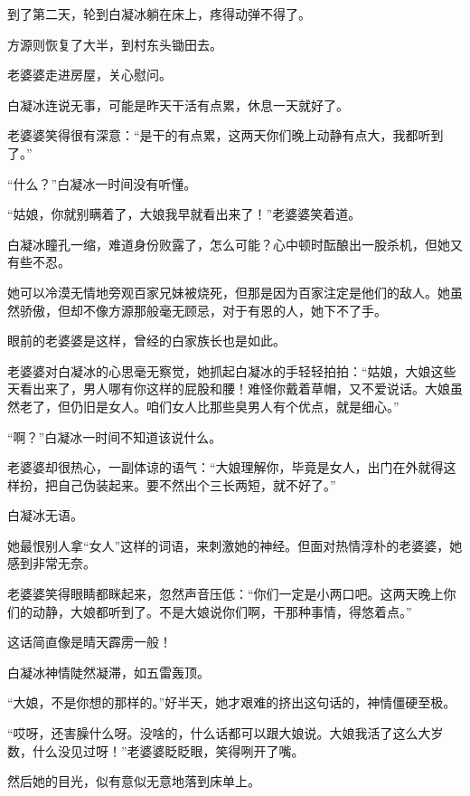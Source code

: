 
\begin{this_body}



到了第二天，轮到白凝冰躺在床上，疼得动弹不得了。

方源则恢复了大半，到村东头锄田去。

老婆婆走进房屋，关心慰问。

白凝冰连说无事，可能是昨天干活有点累，休息一天就好了。

老婆婆笑得很有深意：“是干的有点累，这两天你们晚上动静有点大，我都听到了。”

“什么？”白凝冰一时间没有听懂。

“姑娘，你就别瞒着了，大娘我早就看出来了！”老婆婆笑着道。

白凝冰瞳孔一缩，难道身份败露了，怎么可能？心中顿时酝酿出一股杀机，但她又有些不忍。

她可以冷漠无情地旁观百家兄妹被烧死，但那是因为百家注定是他们的敌人。她虽然骄傲，但却不像方源那般毫无顾忌，对于有恩的人，她下不了手。

眼前的老婆婆是这样，曾经的白家族长也是如此。

老婆婆对白凝冰的心思毫无察觉，她抓起白凝冰的手轻轻拍拍：“姑娘，大娘这些天看出来了，男人哪有你这样的屁股和腰！难怪你戴着草帽，又不爱说话。大娘虽然老了，但仍旧是女人。咱们女人比那些臭男人有个优点，就是细心。”

“啊？”白凝冰一时间不知道该说什么。

老婆婆却很热心，一副体谅的语气：“大娘理解你，毕竟是女人，出门在外就得这样扮，把自己伪装起来。要不然出个三长两短，就不好了。”

白凝冰无语。

她最恨别人拿“女人”这样的词语，来刺激她的神经。但面对热情淳朴的老婆婆，她感到非常无奈。

老婆婆笑得眼睛都眯起来，忽然声音压低：“你们一定是小两口吧。这两天晚上你们的动静，大娘都听到了。不是大娘说你们啊，干那种事情，得悠着点。”

这话简直像是晴天霹雳一般！

白凝冰神情陡然凝滞，如五雷轰顶。

“大娘，不是你想的那样的。”好半天，她才艰难的挤出这句话的，神情僵硬至极。

“哎呀，还害臊什么呀。没啥的，什么话都可以跟大娘说。大娘我活了这么大岁数，什么没见过呀！”老婆婆眨眨眼，笑得咧开了嘴。

然后她的目光，似有意似无意地落到床单上。


\end{this_body}
